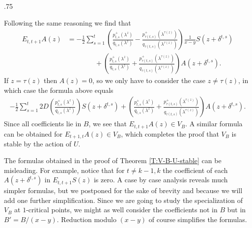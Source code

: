 \documentclass[11pt,fleqn]{article}
\makeatletter
\newcounter{para}[section]
\renewenvironment{proof}[1][\textit{Proof}]{\par
  \pushQED{\qed}%
  \normalfont \topsep.75\paraskip\relax
  \trivlist
  \item[\hskip\labelsep
        \itshape
    #1\@addpunct{.}]\ignorespaces
}{%
  \popQED\endtrivlist\@endpefalse
}
\makeatother
\begin{document}
\begin{proof}
Following the same reasoning we find that 
\begin{align*}
E_{t,t+1} A(z)
	&= - \frac{1}{2} \sum_{s=1}^t 
		\left(
			\frac{p_{t,s}^+(\lambda^z)}{q_{t,s}(\lambda^z)} - 
			\frac{p_{\tau(t,s)}^+(\lambda^{\tau(z)})}
				{q_{\tau(t,s)}(\lambda^{\tau(z)})}
		\right) \frac{1}{x-y} S(z + \delta^{t,s}) \\
	&\qquad \qquad + \left( 
		\frac{p_{t,s}^+(\lambda^z)}{q_{t,s}(\lambda^z)} + 
		\frac{p_{\tau(t,s)}^+(\lambda^{\tau(z)})}
			{q_{\tau(t,s)}(\lambda^{\tau(z)})}
	\right) A(z+\delta^{t,s}).
\end{align*}
If $z = \tau(z)$ then $A(z) = 0$, so we only have to consider the case
$z \neq \tau(z)$, in which case the formula above equals
\begin{align*}
- \frac{1}{2} \sum_{s=1}^t 
	2D\left(
		\frac{p_{t,s}^+(\lambda^z)}{q_{t,s}(\lambda^z)}
	\right) S(z + \delta^{t,s}) + \left( 
		\frac{p_{t,s}^+(\lambda^z)}{q_{t,s}(\lambda^z)} + 
		\frac{p_{\tau(t,s)}^+(\lambda^{\tau(z)})}
			{q_{\tau(t,s)}(\lambda^{\tau(z)})}
	\right) A(z+\delta^{t,s}). 
\end{align*}
Since all coefficients lie in $B$, we see that $E_{t,t+1} A(z) \in V_B$.
A similar formula can be obtained for $E_{t+1,t} A(z) \in V_B$, which completes
the proof that $V_B$ is stable by the action of $U$.
\end{proof}

The formulas obtained in the proof of Theorem \ref{T:V-B-U-stable} can be misleading. 
For example, notice that for $t \neq k-1,k$ the coefficient of each $A(z + 
\delta^{t,s})$ in $E_{t,t+1} S(z)$ is zero. A case by case analysis reveals 
much simpler formulas, but we postponed for the sake of brevity and because 
we will add one further simplification. Since we are going to study the 
specialization of $V_B$ at $1$-critical points, we might as well consider the 
coefficients not in $B$ but in $B' = B/(x-y)$. Reduction modulo $(x-y)$ of
course simplifies the formulas. 
\end{document}
